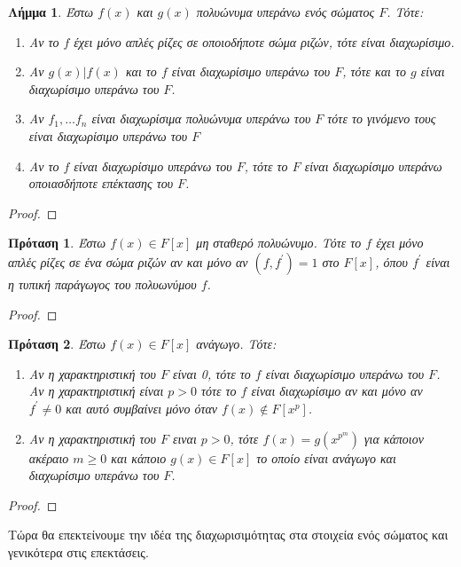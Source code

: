 \documentclass[oneside,a4paper]{article}
\newtheorem{lemma}{Λήμμα}
\newtheorem{prop}{Πρόταση}
\begin{document}
\begin{lemma}
	\label{tessera tria}
	Έστω $f(x)$ και $g(x)$ πολυώνυμα υπεράνω ενός σώματος $F$. Τότε:
	\begin{enumerate}
		\item Αν το $f$ έχει μόνο απλές ρίζες σε οποιοδήποτε σώμα ριζών, τότε είναι διαχωρίσιμο.
		\item Αν $g(x) | f(x)$ και το $f$ είναι διαχωρίσιμο υπεράνω του $F$, τότε και το $g$ είναι διαχωρίσιμο υπεράνω του $F$.
		\item  Αν $f_1 , \ldots f_n$ είναι διαχωρίσιμα πολυώνυμα υπεράνω του $F$ τότε το γινόμενο τους είναι διαχωρίσιμο υπεράνω του $F$
		\item  Αν το $f$ είναι διαχωρίσιμο υπεράνω του $F$, τότε το $F$ είναι διαχωρίσιμο υπεράνω οποιασδήποτε επέκτασης του $F$.
	\end{enumerate}

\end{lemma}
\begin{proof}
\end{proof}


\begin{prop}Έστω $f(x) \in F[x]$ μη σταθερό πολυώνυμο. Τότε το $f$ έχει μόνο απλές ρίζες σε ένα σώμα ριζών αν και μόνο αν $(f,f^{\prime})=1$ στο $F[x]$, όπου $f^{\prime}$ είναι η τυπική παράγωγος του πολυωνύμου $f$.

\end{prop}

\begin{proof}
\end{proof}

\begin{prop}Έστω $f(x) \in F[x]$ ανάγωγο. Τότε:
	\begin{enumerate} 
		\item Αν η χαρακτηριστική του $F$ είναι 0, τότε το $f$ είναι διαχωρίσιμο υπεράνω του $F$. Αν η χαρακτηριστική είναι $p > 0$ τότε το $f$ είναι διαχωρίσιμο αν και μόνο αν $f^{\prime} \neq 0$ και αυτό συμβαίνει μόνο όταν $f(x) \not\in F[x^p]$.
		\item Αν η χαρακτηριστική του $F$ ειναι $p>0$, τότε $f(x) = g(x^{p^m})$ για κάποιον ακέραιο $m\geq 0$ και κάποιο $g(x) \in F[x]$ το οποίο είναι ανάγωγο και διαχωρίσιμο υπεράνω του $F$.
	\end{enumerate}
\end{prop}
\begin{proof}
\end{proof}


\noindent Τώρα θα επεκτείνουμε την ιδέα της διαχωρισιμότητας στα στοιχεία ενός σώματος και γενικότερα στις επεκτάσεις.
\end{document}
